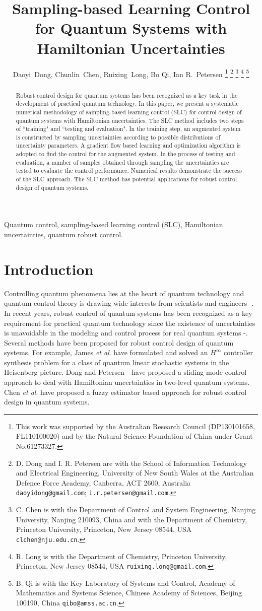 \documentclass[letterpaper, 10 pt, conference]{ieeeconf}
\title{\LARGE \bf
Sampling-based Learning Control for Quantum Systems with Hamiltonian Uncertainties}
\author{Daoyi~Dong, Chunlin~Chen, Ruixing~Long, Bo Qi, Ian R.~Petersen
\thanks{This work was supported by the Australian Research Council (DP130101658, FL110100020)
and by the Natural Science
Foundation of China under Grant No.61273327.}
\thanks{D. Dong  and I. R. Petersen are with the School of Information Technology and Electrical
Engineering, University of New South Wales at the Australian Defence
Force Academy, Canberra, ACT 2600, Australia {\tt\small daoyidong@gmail.com}; {\tt\small i.r.petersen@gmail.com}.}
\thanks{C. Chen is with the Department of Control and System Engineering, Nanjing
University, Nanjing 210093, China and with the Department of
Chemistry, Princeton University, Princeton, New Jersey 08544, USA
{\tt\small clchen@nju.edu.cn}.}
\thanks{R. Long is with the Department of
Chemistry, Princeton University, Princeton, New Jersey 08544, USA
{\tt\small ruixing.long@gmail.com}.}
\thanks{B. Qi is with the Key Laboratory of Systems and Control,
Academy of Mathematics and Systems Science, Chinese Academy
of Sciences, Beijing 100190, China {\tt\small qibo@amss.ac.cn}.}
}
\begin{document}
\maketitle
\begin{abstract}
Robust control design for quantum systems has been recognized as a key task in the development of practical quantum technology. In this
paper, we present a systematic numerical methodology of sampling-based
learning control (SLC) for control design of quantum systems with Hamiltonian uncertainties.
The SLC method includes two steps of ``training" and ``testing and
evaluation". In the training step, an augmented system is
constructed by sampling uncertainties according to possible
distributions of uncertainty parameters. A gradient flow based
learning and optimization algorithm is adopted to find the control
for the augmented system. In the process of testing and
evaluation, a number of samples obtained through sampling the uncertainties are tested to
evaluate the control performance. Numerical results
demonstrate the success of the SLC
approach. The SLC method has potential applications for robust control design of
quantum systems.
\end{abstract}

\begin{keywords}
Quantum control, sampling-based learning
control (SLC), Hamiltonian uncertainties, quantum robust control.
\end{keywords}

\section{Introduction}\label{Sec1}
Controlling quantum phenomena lies at the heart of quantum technology and quantum
control theory is drawing wide interests from scientists and engineers
\cite{Dong and Petersen 2010IET}-\cite{Brif et al 2010}. In recent years, robust control of quantum systems has been recognized as a key requirement
for practical quantum technology since the existence of uncertainties is unavoidable in the modeling and control process for real quantum
systems \cite{Pravia et al 2003}-\cite{James 2004}. Several methods have been
proposed for robust control design of quantum systems. For example,
James \emph{et al}. \cite{James et al 2007} have formulated and
solved an $H^{\infty}$ controller synthesis problem for a class of
quantum linear stochastic systems in the Heisenberg picture. Dong
and Petersen \cite{Dong and Petersen 2009NJP}-\cite{Dong and Petersen 2011IFAC} have proposed a sliding mode control
approach to deal with Hamiltonian uncertainties in two-level quantum systems. Chen
\emph{et al}. \cite{Chen et al 2012} have proposed a fuzzy estimator based approach
for robust control design in quantum systems.
\end{document}
